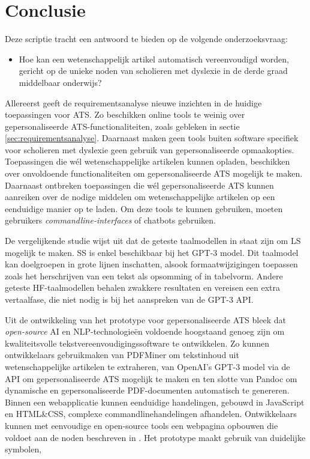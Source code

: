 
\chapter{Conclusie}%
\label{ch:conclusie}

Deze scriptie tracht een antwoord te bieden op de volgende onderzoeksvraag:

\begin{itemize}
	\item Hoe kan een wetenschappelijk artikel automatisch vereenvoudigd worden, gericht op de unieke noden van scholieren met dyslexie in de derde graad middelbaar onderwijs?
\end{itemize}

Allereerst geeft de requirementsanalyse nieuwe inzichten in de huidige toepassingen voor ATS. Zo beschikken online tools te weinig over gepersonaliseerde ATS-functionaliteiten, zoals gebleken in sectie \ref{sec:requirementsanalyse}. Daarnaast maken geen tools buiten software specifiek voor scholieren met dyslexie geen gebruik van gepersonaliseerde opmaakopties. Toepassingen die wél wetenschappelijke artikelen kunnen opladen, beschikken over onvoldoende functionaliteiten om gepersonaliseerde ATS mogelijk te maken. Daarnaast ontbreken toepassingen die wél gepersonaliseerde ATS kunnen aanreiken over de nodige middelen om wetenschappelijke artikelen op een eenduidige manier op te laden. Om deze tools te kunnen gebruiken, moeten gebruikers \textit{commandline-interfaces} of chatbots gebruiken.

\medspace

De vergelijkende studie wijst uit dat de geteste taalmodellen in staat zijn om LS mogelijk te maken. SS is enkel beschikbaar bij het GPT-3 model. Dit taalmodel kan doelgroepen in grote lijnen inschatten, alsook formaatwijzigingen toepassen zoals het herschrijven van een tekst als opsomming of in tabelvorm. Andere geteste HF-taalmodellen behalen zwakkere resultaten en vereisen een extra vertaalfase, die niet nodig is bij het aanspreken van de GPT-3 API.

\medspace

Uit de ontwikkeling van het prototype voor gepersonaliseerde ATS bleek dat \textit{open-source} AI en NLP-technologieën voldoende hoogstaand genoeg zijn om kwaliteitsvolle tekstvereenvoudigingssoftware te ontwikkelen. Zo kunnen ontwikkelaars gebruikmaken van PDFMiner om tekstinhoud uit wetenschappelijke artikelen te extraheren, van OpenAI's GPT-3 model via de API om gepersonaliseerde ATS mogelijk te maken en ten slotte van Pandoc om dynamische en gepersonaliseerde PDF-documenten automatisch te genereren. Binnen een webapplicatie kunnen eenduidige handelingen, gebouwd in JavaScript en HTML\&CSS, complexe commandlinehandelingen afhandelen. Ontwikkelaars kunnen met eenvoudige en open-source tools een webpagina opbouwen die voldoet aan de noden beschreven in \textcite{Rello2012a}. Het prototype maakt gebruik van duidelijke symbolen, 

